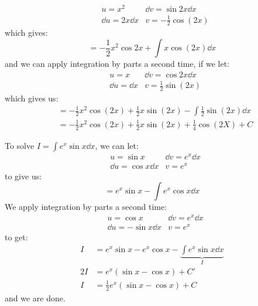 \begin{itemize}
\begin{example}
\begin{align}
            &u=x^2            &\dd{v} = \sin 2x\dd{x} \\ 
            &\dd{u}=2x\dd{x} &v=-\frac{1}{2}\cos(2x) 
        \end{align}
        which gives:
        \begin{equation}
            =-\frac{1}{2}x^2\cos 2x + \int x\cos(2x) \dd{x}
        \end{equation}
        and we can apply integration by parts a second time, if we let:
        \begin{align}
            &u=x            &\dd{v} = \cos 2x\dd{x} \\ 
            &\dd{u}=\dd{x} &v=\frac{1}{2}\sin(2x) 
        \end{align}
        which gives us:
        \begin{align}
            &=-\frac{1}{2}x^2\cos(2x) + \frac{1}{2}x\sin(2x) - \int \frac{1}{2}\sin(2x) \dd{x} \\ 
            &=-\frac{1}{2}x^2\cos(2x)+\frac{1}{2}x\sin(2x) +\frac{1}{4}\cos(2X)+C
        \end{align}
    \end{example}
    \begin{example}
        To solve $I=\int e^{x}\sin x\dd{x}$, we can let:
        \begin{align}
            &u=\sin x            &\dd{v} =e^x\dd{x} \\ 
            &\dd{u}=\cos x\dd{x} &v=e^x
        \end{align}
        to give us:
        \begin{equation}
            = e^x\sin x - \int e^{x}\cos x \dd{x}
        \end{equation}
        We apply integration by parts a second time:
        \begin{align}
            &u=\cos x            &\dd{v} =e^x\dd{x} \\ 
            &\dd{u}=-\sin x\dd{x} &v=e^x
        \end{align}
        to get:
        \begin{align}
            I&=e^x\sin x - e^x\cos x - \underbrace{\int e^x\sin x \dd{x}}_{I} \\ 
            2I &= e^x\left(\sin x - \cos x\right) + C' \\ 
            I &= \frac{1}{2}e^x\left(\sin x - \cos x\right) + C
        \end{align}
        and we are done.
    \end{example}
    \begin{example}

\end{example}
\end{itemize}
